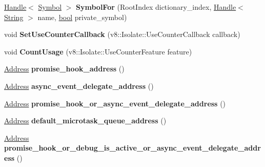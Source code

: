 \begin{DoxyCompactItemize}
\mbox{\hyperlink{classv8_1_1internal_1_1Handle}{Handle}}$<$ \mbox{\hyperlink{classv8_1_1internal_1_1Symbol}{Symbol}} $>$ {\bfseries Symbol\+For} (Root\+Index dictionary\+\_\+index, \mbox{\hyperlink{classv8_1_1internal_1_1Handle}{Handle}}$<$ \mbox{\hyperlink{classv8_1_1internal_1_1String}{String}} $>$ name, \mbox{\hyperlink{classbool}{bool}} private\+\_\+symbol)
\item 
\mbox{\label{classv8_1_1internal_1_1Isolate_a774d9acf270e7e3145c40bb081413135}} 
void {\bfseries Set\+Use\+Counter\+Callback} (v8\+::\+Isolate\+::\+Use\+Counter\+Callback callback)
\item 
\mbox{\label{classv8_1_1internal_1_1Isolate_a2fbd063d0fbd9a69e5e5adebceefddf1}} 
void {\bfseries Count\+Usage} (v8\+::\+Isolate\+::\+Use\+Counter\+Feature feature)
\item 
\mbox{\label{classv8_1_1internal_1_1Isolate_a56e5e7cdbcf9fc16e1e8ff9a96e1e167}} 
\mbox{\hyperlink{classuintptr__t}{Address}} {\bfseries promise\+\_\+hook\+\_\+address} ()
\item 
\mbox{\label{classv8_1_1internal_1_1Isolate_a9b2fea4505fe111ee09f2506fc605f89}} 
\mbox{\hyperlink{classuintptr__t}{Address}} {\bfseries async\+\_\+event\+\_\+delegate\+\_\+address} ()
\item 
\mbox{\label{classv8_1_1internal_1_1Isolate_a6a7fdb1e7af9382e0af0d65842d0e2a4}} 
\mbox{\hyperlink{classuintptr__t}{Address}} {\bfseries promise\+\_\+hook\+\_\+or\+\_\+async\+\_\+event\+\_\+delegate\+\_\+address} ()
\item 
\mbox{\label{classv8_1_1internal_1_1Isolate_a2795ac0a53a18d581c0d393c427438e5}} 
\mbox{\hyperlink{classuintptr__t}{Address}} {\bfseries default\+\_\+microtask\+\_\+queue\+\_\+address} ()
\item 
\mbox{\label{classv8_1_1internal_1_1Isolate_a04d9370ca3d9657023a5e01ec8eb873d}} 
\mbox{\hyperlink{classuintptr__t}{Address}} {\bfseries promise\+\_\+hook\+\_\+or\+\_\+debug\+\_\+is\+\_\+active\+\_\+or\+\_\+async\+\_\+event\+\_\+delegate\+\_\+address} ()
\item 

\end{DoxyCompactItemize}
